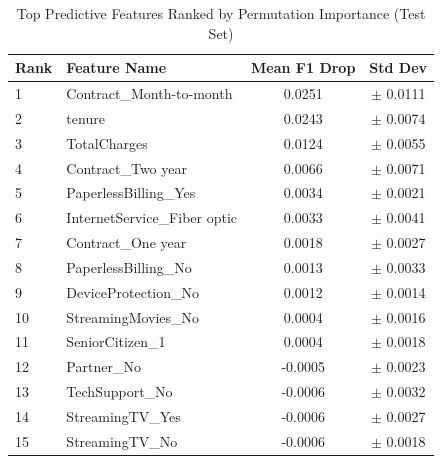 \begin{table}[H]
\centering
\caption{Top Predictive Features Ranked by Permutation Importance (Test Set)}
\label{tab:feature_importance}
\begin{tabular}{llcc}
\toprule
\textbf{Rank} & \textbf{Feature Name} & \textbf{Mean F1 Drop} & \textbf{Std Dev} \\
\midrule
1 & Contract\_Month-to-month & 0.0251 & $\pm$ 0.0111 \\
2 & tenure & 0.0243 & $\pm$ 0.0074 \\
3 & TotalCharges & 0.0124 & $\pm$ 0.0055 \\
4 & Contract\_Two year & 0.0066 & $\pm$ 0.0071 \\
5 & PaperlessBilling\_Yes & 0.0034 & $\pm$ 0.0021 \\
6 & InternetService\_Fiber optic & 0.0033 & $\pm$ 0.0041 \\
7 & Contract\_One year & 0.0018 & $\pm$ 0.0027 \\
8 & PaperlessBilling\_No & 0.0013 & $\pm$ 0.0033 \\
9 & DeviceProtection\_No & 0.0012 & $\pm$ 0.0014 \\
10 & StreamingMovies\_No & 0.0004 & $\pm$ 0.0016 \\
11 & SeniorCitizen\_1 & 0.0004 & $\pm$ 0.0018 \\
12 & Partner\_No & -0.0005 & $\pm$ 0.0023 \\
13 & TechSupport\_No & -0.0006 & $\pm$ 0.0032 \\
14 & StreamingTV\_Yes & -0.0006 & $\pm$ 0.0027 \\
15 & StreamingTV\_No & -0.0006 & $\pm$ 0.0018 \\
\bottomrule
\end{tabular}
\end{table}